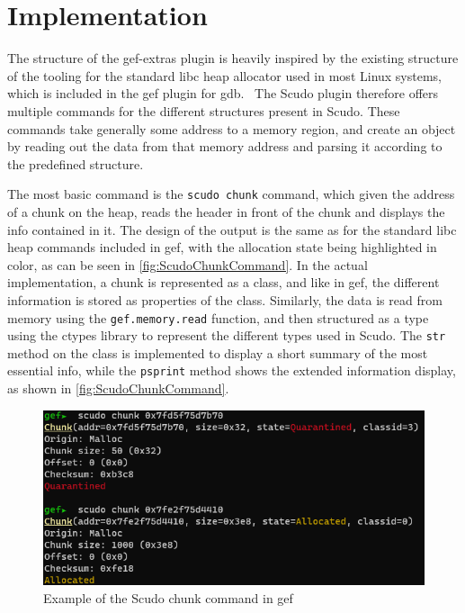 \documentclass[a4paper,11pt,oneside]{report}
\begin{document}
\chapter{Implementation}

The structure of the gef-extras plugin is heavily inspired by the existing
structure of the tooling for the standard libc heap allocator used in most
Linux systems, which is included in the gef plugin for gdb.~\cite{gef} The
Scudo plugin therefore offers multiple commands for the different structures
present in Scudo. These commands take generally some address to a memory
region, and create an object by reading out the data from that memory address
and parsing it according to the predefined structure.

The most basic command is the \verb|scudo chunk| command, which given the address
of a chunk on the heap, reads the header in front of the chunk and displays
the info contained in it. The design of the output is the same as for the
standard libc heap commands included in gef, with the allocation state being
highlighted in color, as can be seen in \autoref{fig:ScudoChunkCommand}.
In the actual implementation, a chunk is represented as a class, and like in
gef, the different information is stored as properties of the class. Similarly,
the data is read from memory using the \verb|gef.memory.read| function, and then
structured as a type using the ctypes library to represent the different types
used in Scudo. The \verb|str| method on the class is implemented to display a short
summary of the most essential info, while the \verb|psprint| method shows the
extended information display, as shown in \autoref{fig:ScudoChunkCommand}.

\begin{figure}[h!]
  \centering
  \includegraphics[width=\linewidth]{figures/ScudoChunkCommand.png}
  \caption{Example of the Scudo chunk command in gef}
  \label{fig:ScudoChunkCommand}
\end{figure}
\end{document}
